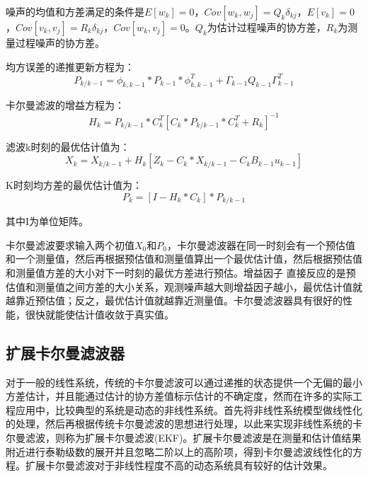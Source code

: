 噪声的均值和方差满足的条件是$E\left[ {{w}_{k}} \right]=0$，$Cov\left[ {{w}_{k}},{{w}_{j}} \right]={{Q}_{k}}{{\delta }_{kj}}$，$E\left[ {{v}_{k}} \right]=0$，$Cov\left[ {{v}_{k}},{{v}_{j}} \right]={{R}_{k}}{{\delta }_{kj}}$，$Cov\left[ {{w}_{k}},{{v}_{j}} \right]=0$。${{Q}_{k}}$为估计过程噪声的协方差，${{R}_{k}}$为测量过程噪声的协方差。


均方误差的递推更新方程为：
\begin{equation}
{{P}_{k/k-1}}={{\phi }_{k,k-1}}*{{P}_{k-1}}*\phi _{k,k-1}^{T}+{{\Gamma }_{k-1}}{{Q}_{k-1}}\Gamma _{k-1}^{T}
\end{equation}

卡尔曼滤波的增益方程为：
\begin{equation}
{{H}_{k}}={{P}_{k/k-1}}*C_{k}^{T}{{\left[ {{C}_{k}}*{{P}_{k/k-1}}*C_{k}^{T}+{{R}_{k}} \right]}^{-1}}
\end{equation}

滤波k时刻的最优估计值为：
\begin{equation}
{{X}_{k}}={{X}_{k/k-1}}+{{H}_{k}}\left[ {{Z}_{k}}-{{C}_{k}}*{{X}_{k/k-1}}-{{C}_{k}}{{B}_{k-1}}{{u}_{k-1}} \right]
\end{equation}

K时刻均方差的最优估计值为：
\begin{equation}
{{P}_{k}}=\left[ I-{{H}_{k}}*{{C}_{k}} \right]*{{P}_{k/k-1}}
\end{equation}

其中I为单位矩阵。

卡尔曼滤波要求输入两个初值${{X}_{0}}$和${{P}_{0}}$，卡尔曼滤波器在同一时刻会有一个预估值和一个测量值，然后再根据预估值和测量值算出一个最优估计值，然后根据预估值和测量值方差的大小对下一时刻的最优方差进行预估。增益因子 直接反应的是预估值和测量值之间方差的大小关系，观测噪声越大则增益因子越小，最优估计值就越靠近预估值；反之，最优估计值就越靠近测量值。卡尔曼滤波器具有很好的性能，很快就能使估计值收敛于真实值。

\subsection{扩展卡尔曼滤波器}
对于一般的线性系统，传统的卡尔曼滤波可以通过递推的状态提供一个无偏的最小方差估计，并且能通过估计的协方差值标示估计的不确定度，然而在许多的实际工程应用中，比较典型的系统是动态的非线性系统。首先将非线性系统模型做线性化的处理，然后再根据传统卡尔曼滤波的思想进行处理，以此来实现非线性系统的卡尔曼滤波，则称为扩展卡尔曼滤波(EKF)。扩展卡尔曼滤波是在测量和估计值结果附近进行泰勒级数的展开并且忽略二阶以上的高阶项，得到卡尔曼滤波线性化的方程。扩展卡尔曼滤波对于非线性程度不高的动态系统具有较好的估计效果。

